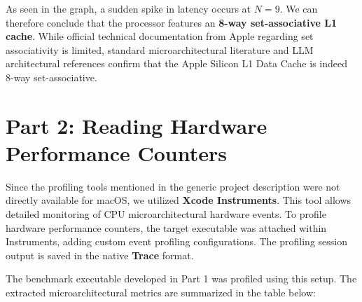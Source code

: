 \documentclass{article}
\begin{document}
	\begin{tcolorbox}[colback=green!5!white, colframe=green!75!black, title=Results]
		As seen in the graph, a sudden spike in latency occurs at $N = 9$. We can therefore conclude that the processor features an \textbf{8-way set-associative L1 cache}. While official technical documentation from Apple regarding set associativity is limited, standard microarchitectural literature and LLM architectural references confirm that the Apple Silicon L1 Data Cache is indeed 8-way set-associative.
	\end{tcolorbox}
	
	\vspace{2cm}
	\section{Part 2: Reading Hardware Performance Counters}
	
	\begin{tcolorbox}[colback=blue!5!white, colframe=blue!75!black, title=Notes]
		Since the profiling tools mentioned in the generic project description were not directly available for macOS, we utilized \textbf{Xcode Instruments}. This tool allows detailed monitoring of CPU microarchitectural hardware events.
		To profile hardware performance counters, the target executable was attached within Instruments, adding custom event profiling configurations. The profiling session output is saved in the native \textbf{Trace} format.
	\end{tcolorbox}
	
	The benchmark executable developed in Part 1 was profiled using this setup. The extracted microarchitectural metrics are summarized in the table below:
	
\end{document}
